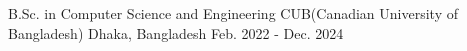 

\begin{cventries}

  \cventry
    {B.Sc. in Computer Science and Engineering} %
    {CUB(Canadian University of Bangladesh)} %
    {\textsf{Dhaka, Bangladesh}} %
    {\textsf{Feb. 2022 - Dec. 2024}} %
    {}%

\end{cventries}
